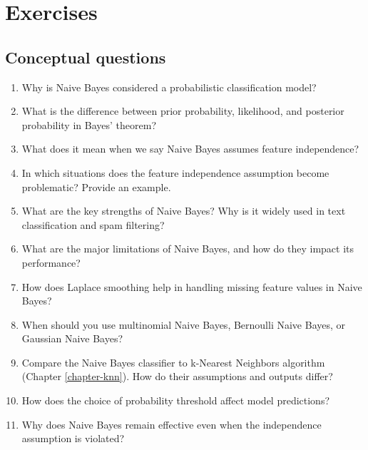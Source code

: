\documentclass[
  11pt,
]{book}
\providecommand{\tightlist}{%
  \setlength{\itemsep}{0pt}\setlength{\parskip}{0pt}}
\theoremstyle{definition}
\theoremstyle{definition}
\theoremstyle{definition}
\theoremstyle{definition}
\theoremstyle{remark}
\begin{document}
\section{Exercises}\label{exercises-7}

\subsection*{Conceptual questions}\label{conceptual-questions-5}


\begin{enumerate}
\def\labelenumi{\arabic{enumi}.}
\tightlist
\item
  Why is Naive Bayes considered a probabilistic classification model?\\
\item
  What is the difference between prior probability, likelihood, and posterior probability in Bayes' theorem?\\
\item
  What does it mean when we say Naive Bayes assumes feature independence?\\
\item
  In which situations does the feature independence assumption become problematic? Provide an example.\\
\item
  What are the key strengths of Naive Bayes? Why is it widely used in text classification and spam filtering?\\
\item
  What are the major limitations of Naive Bayes, and how do they impact its performance?\\
\item
  How does Laplace smoothing help in handling missing feature values in Naive Bayes?\\
\item
  When should you use multinomial Naive Bayes, Bernoulli Naive Bayes, or Gaussian Naive Bayes?\\
\item
  Compare the Naive Bayes classifier to k-Nearest Neighbors algorithm (Chapter \ref{chapter-knn}). How do their assumptions and outputs differ?\\
\item
  How does the choice of probability threshold affect model predictions?\\
\item
  Why does Naive Bayes remain effective even when the independence assumption is violated?\\

\end{enumerate}
\end{document}
